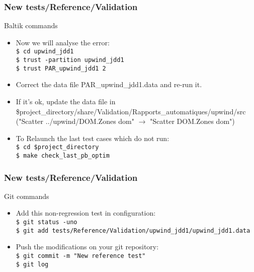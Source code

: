\documentclass[10pt, hyperref={unicode=true,pdfusetitle, bookmarks=true,bookmarksnumbered=false,bookmarksopen=false, breaklinks=false,pdfborder={0 0 1},backref=true,colorlinks=true,linkcolor=darkblue,pageanchor, urlcolor=darkblue}]{beamer}
\begin{document}
\begin{frame}
\frametitle{New tests/Reference/Validation}
\begin{block}{Baltik commands}

\begin{itemize}
\item Now we will analyse the error:\\
\texttt{\$ cd upwind\_jdd1}\\
\texttt{\$ trust -partition upwind\_jdd1}\\
\texttt{\$ trust PAR\_upwind\_jdd1 2}\\
\item Correct the data file PAR\_upwind\_jdd1.data and re-run it.
\item If it's ok, update the data file in 
\$project\_directory/share/Validation/Rapports\_automatiques/upwind/src\\
("Scatter ../upwind/DOM.Zones dom" $\rightarrow$ "Scatter DOM.Zones dom")\\
\item To Relaunch the last test cases which do not run:\\
\texttt{\$ cd \$project\_directory}\\
\texttt{\$ make check\_last\_pb\_optim}\\
\end{itemize}

\end{block}
\end{frame}
\begin{frame}
\frametitle{New tests/Reference/Validation}
\begin{alertblock}{Git commands}

\begin{itemize}
\item Add this non-regression test in configuration:\\
\texttt{\$ git status -uno}\\
\texttt{\$ git add tests/Reference/Validation/upwind\_jdd1/upwind\_jdd1.data}\\
\item Push the modifications on your git repository:\\
\texttt{\$ git commit -m "New reference test"}\\
\texttt{\$ git log}\\
\end{itemize}

\end{alertblock}
\end{frame}
\end{document}
